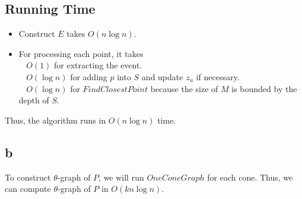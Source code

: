 \documentclass[12pt]{article}
\begin{document}
\subsection*{Running Time}
\begin{itemize}
    \item Construct $E$ takes $O(n\log{n})$.
    \item For processing each point, it takes \\
    $\;\;$ $O(1)$ for extracting the event.\\
    $\;\;$ $O(\log{n})$ for adding $p$ into $S$ and update $z_u$ if necessary. \\
    $\;\;$ $O(\log{n})$ for $FindClosestPoint$ because the size of $M$ is bounded by the depth of $S$. \\
\end{itemize}

Thus, the algorithm runs in $O(n\log{n})$ time.

\subsection*{b}
To construct $\theta$-graph of $P$, we will run $OneConeGraph$ for each cone. Thus,
we can compute $\theta$-graph of $P$ in $O(kn\log{n})$.
\end{document}

